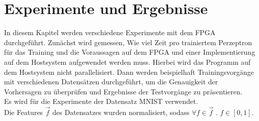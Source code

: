 \chapter{Experimente und Ergebnisse}
In diesem Kapitel werden verschiedene Experimente mit dem FPGA durchgeführt. Zunächst wird gemessen, Wie viel Zeit pro trainiertem Perzeptron für das Training und die Voraussagen auf dem FPGA und einer Implementierung auf dem Hostsystem aufgewendet werden muss. Hierbei wird das Programm auf dem Hostsystem nicht parallelisiert. 
Dann werden beispielhaft Trainingsvorgänge mit verschiedenen Datensätzen durchgeführt, um die Genauigkeit der Vorhersagen zu überprüfen und Ergebnisse der Testvorgänge zu präsentieren.\\
Es wird für die Experimente der Datensatz MNIST \cite{MNIST} verwendet.\\
Die Features $\vec f$ des Datensatzes wurden normalisiert, sodass $\forall f \in \vec f\text{ . } f \in [0,1]$. 
